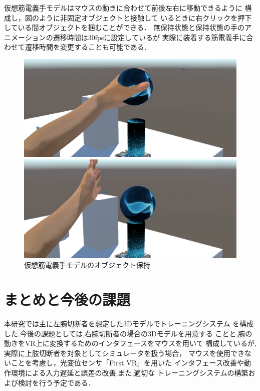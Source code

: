 \documentclass{ltjsarticle}
\begin{document}
		仮想筋電義手モデルはマウスの動きに合わせて前後左右に移動できるように
		構成し，図のように非固定オブジェクトと接触して
		いるときに右クリックを押下している間オブジェクトを掴むことができる．
		無保持状態と保持状態の手のアニメーションの遷移時間は30fpsに設定しているが
		実際に装着する筋電義手に合わせて遷移時間を変更することも可能である．

		\begin{figure}[H]
		\centering
		\begin{minipage}{0.4\columnwidth}
		\centering
		\includegraphics[width = \columnwidth]{figs/spheregrap2.png}
		\end{minipage}
		\hspace{0.05\columnwidth}
		\begin{minipage}{0.4\columnwidth}
		\centering
		\includegraphics[width = \columnwidth]{figs/spherereleace.png}
		\end{minipage}
		\vspace{-10pt}
		\caption{仮想筋電義手モデルのオブジェクト保持}
		\label{fig:spheregrap}
		\end{figure}
		\vspace{-34pt}

\section{まとめと今後の課題}
	本研究では主に左腕切断者を想定した3Dモデルでトレーニングシステム
	を構成した.今後の課題としては,右腕切断者の場合の3Dモデルを用意する
	ことと,腕の動きをVR上に変換するためのインタフェースをマウスを用いて
	構成しているが,実際に上肢切断者を対象としてシミュレータを扱う場合，
	マウスを使用できないことを考慮し，光変位センサ「First VR」を用いた
	インタフェース改善や動作環境による入力遅延と誤差の改善,また,適切な
	トレーニングシステムの構築および検討を行う予定である．
\vspace{-12pt}
\end{document}
